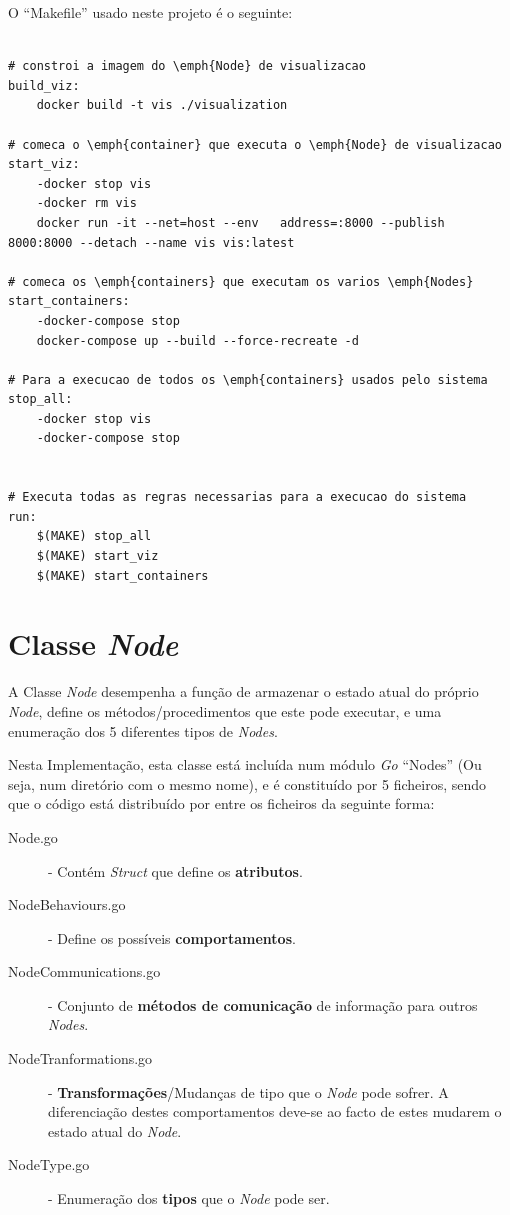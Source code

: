 O ``Makefile'' usado neste projeto é o seguinte:

\begin{lstlisting}[caption={Ficheiro ``Makefile''}]

# constroi a imagem do \emph{Node} de visualizacao
build_viz:
	docker build -t vis ./visualization

# comeca o \emph{container} que executa o \emph{Node} de visualizacao
start_viz:
	-docker stop vis
	-docker rm vis
	docker run -it --net=host --env   address=:8000 --publish 8000:8000 --detach --name vis vis:latest

# comeca os \emph{containers} que executam os varios \emph{Nodes}
start_containers:
	-docker-compose stop
	docker-compose up --build --force-recreate -d

# Para a execucao de todos os \emph{containers} usados pelo sistema
stop_all:
	-docker stop vis
	-docker-compose stop


# Executa todas as regras necessarias para a execucao do sistema
run:
	$(MAKE) stop_all
	$(MAKE) start_viz
	$(MAKE) start_containers
\end{lstlisting}


\section{Classe \emph{Node}}
\label{implementacao:sec:classe_node}
A Classe \emph{Node} desempenha a função de armazenar o estado atual do próprio \emph{Node}, define os métodos/procedimentos que este pode executar, e uma enumeração dos 5 diferentes tipos de \emph{Nodes}.



Nesta Implementação, esta classe está incluída num módulo \emph{Go} ``Nodes'' (Ou seja, num diretório com o mesmo nome), e é constituído por 5 ficheiros, sendo que o código está distribuído por entre os ficheiros da seguinte forma:

\begin{description}
    \item [Node.go] - Contém \emph{Struct} que define os \textbf{atributos}.
    \item [NodeBehaviours.go] - Define os possíveis \textbf{comportamentos}.
    \item [NodeCommunications.go] - Conjunto de \textbf{métodos de comunicação} de informação para outros \emph{Nodes}.
    \item [NodeTranformations.go] - \textbf{Transformações}/Mudanças de tipo que o \emph{Node} pode sofrer. A diferenciação destes comportamentos deve-se ao facto de estes mudarem o estado atual do \emph{Node}.
    \item [NodeType.go] - Enumeração dos \textbf{tipos} que o \emph{Node} pode ser.
\end{description} 


